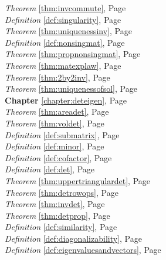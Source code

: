 \begin{multicols}{3}
\begin{center}
      \textit{Theorem} \ref{thm:invcommute}, Page \pageref{thm:invcommute} \\
      \textit{Definition} \ref{def:singularity}, Page \pageref{def:singularity} \\
      \textit{Theorem} \ref{thm:uniquenessinv}, Page \pageref{thm:uniquenessinv} \\
      \textit{Definition} \ref{def:nonsingmat}, Page \pageref{def:nonsingmat} \\
      \textit{Theorem} \ref{thm:propnonsingmat}, Page \pageref{thm:propnonsingmat} \\
      \textit{Theorem} \ref{thm:matexplaw}, Page \pageref{thm:matexplaw} \\
      \textit{Theorem} \ref{thm:2by2inv}, Page \pageref{thm:2by2inv} \\
      \textit{Theorem} \ref{thm:uniquenessofsol}, Page \pageref{thm:uniquenessofsol} \\
      \textbf{Chapter} \ref{chapter:deteigen}, Page \pageref{chapter:deteigen} \\
      \textit{Theorem} \ref{thm:areadet}, Page \pageref{thm:areadet} \\
      \textit{Theorem} \ref{thm:voldet}, Page \pageref{thm:voldet} \\
      \textit{Definition} \ref{def:submatrix}, Page \pageref{def:submatrix} \\
      \textit{Definition} \ref{def:minor}, Page \pageref{def:minor} \\
      \textit{Definition} \ref{def:cofactor}, Page \pageref{def:cofactor} \\
      \textit{Definition} \ref{def:det}, Page \pageref{def:det} \\
      \textit{Theorem} \ref{thm:uppertriangulardet}, Page \pageref{thm:uppertriangulardet} \\
      \textit{Theorem} \ref{thm:detrowops}, Page \pageref{thm:detrowops} \\
      \textit{Theorem} \ref{thm:invdet}, Page \pageref{thm:invdet} \\
      \textit{Theorem} \ref{thm:detprop}, Page \pageref{thm:detprop} \\
      \textit{Definition} \ref{def:similarity}, Page \pageref{def:similarity} \\
      \textit{Definition} \ref{def:diagonalizability}, Page \pageref{def:diagonalizability} \\
      \textit{Definition} \ref{def:eigenvaluesandvectors}, Page \pageref{def:eigenvaluesandvectors} \\

\end{center}
\end{multicols}
